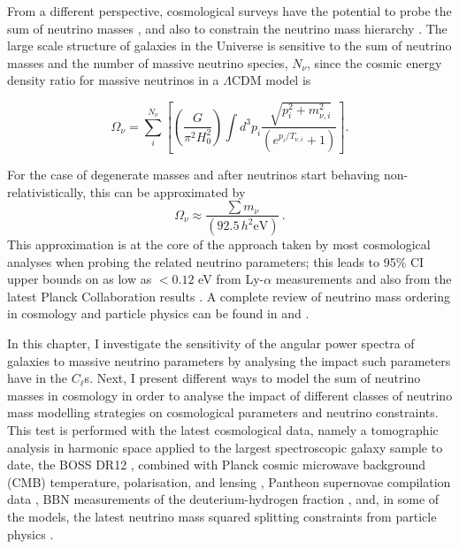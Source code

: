 \qquad From a different perspective, cosmological surveys have the potential to probe the sum of neutrino masses \citep{2007FBA,Thomas2010Neutr}, and also to constrain the neutrino mass hierarchy \citep{2003HannestadNeutrino,2016Hannestad}. The large scale structure of galaxies in the Universe is sensitive to the sum of neutrino masses and the number of massive neutrino species, $N_{\nu}$, since the cosmic energy density ratio for massive neutrinos in a $\Lambda$CDM model is

\begin{equation}
\label{Eq:NeutrinoOmega}
    \Omega_{\nu} = \sum_i^{N_{\nu}}\left[\left(\frac{G}{\pi^2H_0^2}\right)\int d^3p_i \frac{\sqrt[]{p_i^2 + m_{\nu,i}^2}}{(e^{p_i/T_{\nu,i}} + 1)} \right].
\end{equation} 

\noindent For the case of degenerate masses and after neutrinos start behaving non-relativistically, this can be approximated by \citep{Thomas2010Neutr}
\begin{equation}
    \Omega_{\nu} \approx \frac{\sum m_{\nu}}{(92.5\, h^2\text{eV})}\, .
\end{equation}
This approximation is at the core of the approach taken by most cosmological analyses when probing the related neutrino parameters; this leads to  95\% CI upper bounds on \NM{} as low as $< 0.12$ eV from Ly-$\alpha$ measurements \citep{2015LyAlpha-Deg} and also from the latest Planck Collaboration results \citep{2018PlanckCosmology}. A complete review of neutrino mass ordering in cosmology and particle physics can be found in \cite{2012Julien-Deg} and \cite{2018MassOrdering}.

\qquad In this chapter, I investigate the sensitivity of the angular power spectra of galaxies to massive neutrino parameters by analysing the impact such parameters have in the $C_{\ell}$s. Next, I present different ways to model the sum of neutrino masses in cosmology in order to analyse the impact of different classes of neutrino mass modelling strategies on cosmological parameters and neutrino constraints. This test is performed with the latest cosmological data, namely a tomographic analysis in harmonic space applied to the largest spectroscopic galaxy sample to date, the BOSS DR12 \citep[][-- also presented in Chapter \ref{Chap:BOSS}]{2018LoureiroBOSS}, combined with Planck cosmic microwave background (CMB) temperature, polarisation, and lensing \citep{PlanckCosmology2016}, Pantheon supernovae compilation data \citep{2018Pantheon}, BBN measurements of the deuterium-hydrogen fraction \citep{2018BBN-Measurements}, and, in some of the models, the latest neutrino mass squared splitting constraints from particle physics \citep{2014Gonzalez-GarciaNeutrino}.


